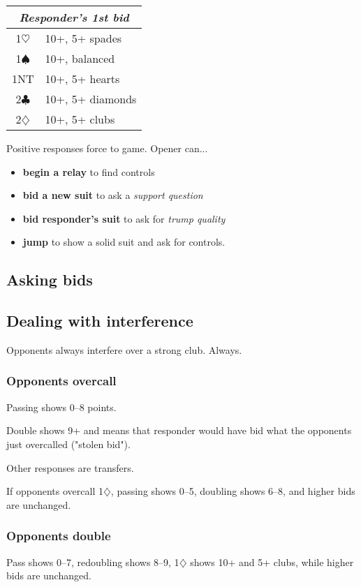 \documentclass[a4paper, twoside, 11pt]{article}
\begin{document}
\begin{multicols}{3}
\begin{center}
\begin{tabular}{ |c|l| }
 \hline
 \multicolumn{2}{|c|}{\textit{Responder's 1st bid}} \\
 \hline
 1$\heartsuit$ & 10+, 5+ spades\\
 1$\spadesuit$ & 10+,  balanced\\
 1NT& 10+, 5+ hearts\\
 2$\clubsuit$ & 10+, 5+ diamonds\\
 2$\diamondsuit$ & 10+, 5+ clubs\\
 \hline
\end{tabular}
\end{center}
 Positive responses force to game. Opener can...
 \begin{itemize}
     \item \textbf{begin a relay} to find controls
     \item \textbf{bid a new suit} to ask a \textit{support question}
     \item \textbf{bid responder's suit} to ask for \textit{trump quality}
     \item \textbf{jump} to show a solid suit and ask for controls.
 \end{itemize}

 \subsection*{Asking bids}

 \subsection*{Dealing with interference}
 Opponents always interfere over a strong club. Always.

 \subsubsection*{Opponents overcall}
Passing shows 0--8 points.

Double shows 9+ and means that responder would have bid what the opponents just overcalled ("stolen bid").

Other responses are transfers.

If opponents overcall 1$\diamondsuit$, passing shows 0--5, doubling shows 6--8, and higher bids are unchanged.

\subsubsection*{Opponents double}
Pass shows 0--7, redoubling shows 8--9, 1$\diamondsuit$ shows 10+ and 5+ clubs, while higher bids are unchanged.


\end{multicols}
\end{document}
